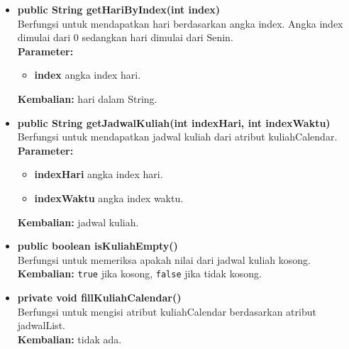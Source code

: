 \begin{enumerate}
\begin{enumerate}
\begin{itemize}
			\item \textbf{public String getHariByIndex(int index)}\\
			Berfungsi untuk mendapatkan hari berdasarkan angka index. Angka index dimulai dari 0 sedangkan hari dimulai dari Senin.\\
			\textbf{Parameter:}
			\begin{itemize}
				\item \textbf{index} angka index hari.
			\end{itemize}
			\textbf{Kembalian:} hari dalam String.
			
			\item \textbf{public String getJadwalKuliah(int indexHari, int indexWaktu)}\\
			Berfungsi untuk mendapatkan jadwal kuliah dari atribut kuliahCalendar.\\
			\textbf{Parameter:}
			\begin{itemize}
				\item \textbf{indexHari} angka index hari.
				\item \textbf{indexWaktu} angka index waktu.
			\end{itemize}
			\textbf{Kembalian:} jadwal kuliah.
			
			\item \textbf{public boolean isKuliahEmpty()}\\
			Berfungsi untuk memeriksa apakah nilai dari jadwal kuliah kosong.\\
			\textbf{Kembalian:} \texttt{true} jika kosong, \texttt{false} jika tidak kosong.
			
			\item \textbf{private void fillKuliahCalendar()}\\
				Berfungsi untuk mengisi atribut kuliahCalendar berdasarkan atribut jadwalList.\\
				\textbf{Kembalian:} tidak ada.
		\end{itemize}
		

\end{enumerate}
\end{enumerate}
